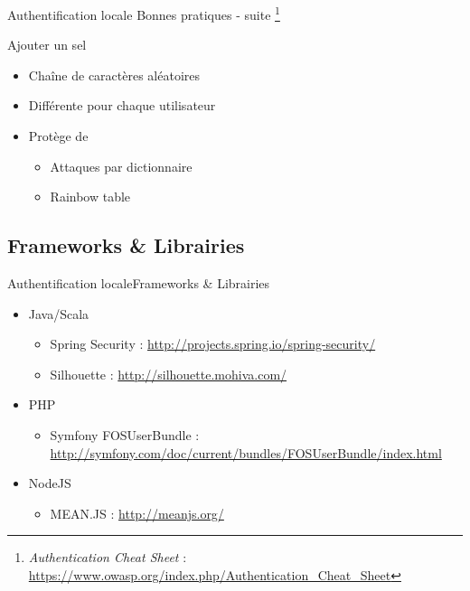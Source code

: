 \documentclass{beamer}
\begin{document}
\begin{frame}{Authentification locale}{
    Bonnes pratiques - suite
    \footnote[frame]{
      \emph{Authentication Cheat Sheet} :
      \url{https://www.owasp.org/index.php/Authentication_Cheat_Sheet}
    }
  }
  \begin{center}
    \begin{block}{Ajouter un sel}
      \begin{itemize}
        \item Chaîne de caractères aléatoires
        \item Différente pour chaque utilisateur
        \item Protège de
          \begin{itemize}
            \item Attaques par dictionnaire
            \item Rainbow table
          \end{itemize}
      \end{itemize}
    \end{block}
  \end{center}
\end{frame}

\subsection{Frameworks \& Librairies}

\begin{frame}{Authentification locale}{Frameworks \& Librairies}
  \begin{center}
    \begin{itemize}
      \item Java/Scala
      \begin{itemize}
        \item Spring Security : \url{http://projects.spring.io/spring-security/}
        \item Silhouette : \url{http://silhouette.mohiva.com/}
      \end{itemize}
      \item PHP
      \begin{itemize}
        \item Symfony FOSUserBundle : \url{http://symfony.com/doc/current/bundles/FOSUserBundle/index.html}
      \end{itemize}
      \item NodeJS
      \begin{itemize}
        \item MEAN.JS : \url{http://meanjs.org/}
      \end{itemize}
    \end{itemize}
  \end{center}
\end{frame}
\end{document}
